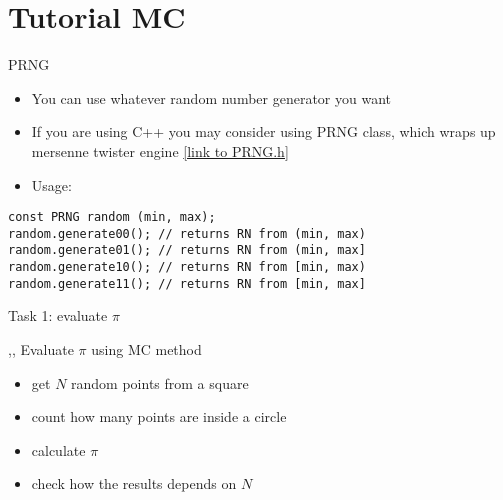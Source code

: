 \section{Tutorial MC}

\begin{slide}[method=direct]{PRNG}
\null\vfill

  \begin{itemize}
   \item You can use whatever random number generator you want
   \item If you are using C++ you may consider using PRNG class, which wraps up mersenne twister engine \href{https://raw.githubusercontent.com/TomaszGolan/simpleClassifiers/master/include/PRNG.h}{[link to PRNG.h]}
   \item Usage:
   
  \end{itemize}

  \begin{verbatim}
const PRNG random (min, max);
random.generate00(); // returns RN from (min, max)
random.generate01(); // returns RN from (min, max]
random.generate10(); // returns RN from [min, max)
random.generate11(); // returns RN from [min, max]
   \end{verbatim}

\vfill\null
\end{slide}

\begin{slide}[toc = Task 1]{Task 1: evaluate $\pi$}
\null\vfill

  \twocolumn
  {
    \sep\sep
    Evaluate $\pi$ using MC method
    \begin{itemize}
      \item get $N$ random points from a square
      \item count how many points are inside a circle
      \item calculate $\pi$
    \item check how the results depends on $N$
    \end{itemize}
  }
  {
    
  }

\vfill\null
\end{slide}

